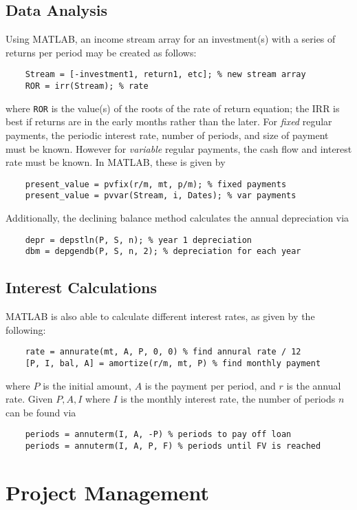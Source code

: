\documentclass[oneside, 12pt]{book}
\begin{document}
\section{Data Analysis}
Using MATLAB, an income stream array for an investment(s) with a series of returns per period may be created as follows:
\begin{verbatim}
    Stream = [-investment1, return1, etc]; % new stream array
    ROR = irr(Stream); % rate
\end{verbatim}
where \texttt{ROR} is the value(s) of the roots of the rate of return equation; the IRR is best if returns are in the early months rather than the later. For \emph{fixed} regular payments, the periodic interest rate, number of periods, and size of payment must be known. However for \emph{variable} regular payments, the cash flow and interest rate must be known. In MATLAB, these is given by
\begin{verbatim}
    present_value = pvfix(r/m, mt, p/m); % fixed payments
    present_value = pvvar(Stream, i, Dates); % var payments
\end{verbatim}
Additionally, the declining balance method calculates the annual depreciation via
\begin{verbatim}
    depr = depstln(P, S, n); % year 1 depreciation
    dbm = depgendb(P, S, n, 2); % depreciation for each year
\end{verbatim}

\section{Interest Calculations}
MATLAB is also able to calculate different interest rates, as given by the following:
\begin{verbatim}
    rate = annurate(mt, A, P, 0, 0) % find annural rate / 12
    [P, I, bal, A] = amortize(r/m, mt, P) % find monthly payment
\end{verbatim}
where $P$ is the initial amount, $A$ is the payment per period, and $r$ is the annual rate. Given $P, A, I$ where $I$ is the monthly interest rate, the number of periods $n$ can be found via
\begin{verbatim}
    periods = annuterm(I, A, -P) % periods to pay off loan
    periods = annuterm(I, A, P, F) % periods until FV is reached
\end{verbatim}

\chapter{Project Management}
\end{document}
